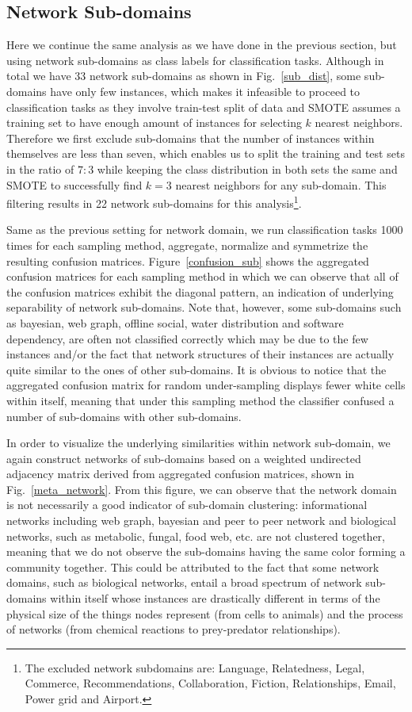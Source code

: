 \subsection*{Network Sub-domains}
Here we continue the same analysis as we have done in the previous section, but using network sub-domains as class labels for classification tasks.
Although in total we have 33 network sub-domains as shown in Fig.~\ref{sub_dist}, some sub-domains have only few instances, which makes it infeasible to proceed to classification tasks as they involve train-test split of data and SMOTE assumes a training set to have enough amount of instances for selecting $k$ nearest neighbors. Therefore we first exclude sub-domains that the number of instances within themselves are less than seven, which enables us to split the training and test sets in the ratio of $7:3$ while keeping the class distribution in both sets the same and SMOTE to successfully find $k=3$ nearest neighbors for any sub-domain. This filtering results in 22 network sub-domains for this analysis\footnote{The excluded network subdomains are: Language, Relatedness, Legal, Commerce, Recommendations, Collaboration, Fiction, Relationships, Email, Power grid and Airport.}. 

Same as the previous setting for network domain, we run classification tasks 1000 times for each sampling method, aggregate, normalize and symmetrize the resulting confusion matrices. Figure~\ref{confusion_sub} shows the aggregated confusion matrices for each sampling method in which we can observe that all of the confusion matrices exhibit the diagonal pattern, an indication of underlying separability of network sub-domains. Note that, however, some sub-domains such as bayesian, web graph, offline social, water distribution and software dependency, are often not classified correctly which may be due to the few instances and/or the fact that network structures of their instances are actually quite similar to the ones of other sub-domains. It is obvious to notice that the aggregated confusion matrix for random under-sampling displays fewer white cells within itself, meaning that under this sampling method the classifier confused a number of sub-domains with other sub-domains.

In order to visualize the underlying similarities within network sub-domain, we again construct networks of sub-domains based on a weighted undirected adjacency matrix derived from aggregated confusion matrices, shown in Fig.~\ref{meta_network}. From this figure, we can observe that the network domain is not necessarily a good indicator of sub-domain clustering: informational networks including web graph, bayesian and peer to peer network and biological networks, such as metabolic, fungal, food web, etc. are not clustered together, meaning that we do not observe the sub-domains having the same color forming a community together. This could be attributed to the fact that some network domains, such as biological networks, entail a broad spectrum of network sub-domains within itself whose instances are drastically different in terms of the physical size of the things nodes represent (from cells to animals) and the process of networks (from chemical reactions to prey-predator relationships). 

